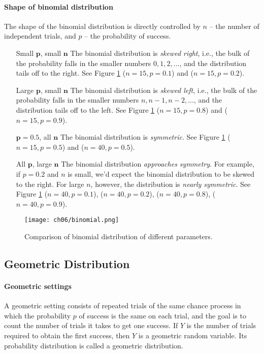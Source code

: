 \paragraph{Shape of binomial distribution} The shape of the binomial distribution is directly controlled by $n$ -- the number of independent trials, and $p$ -- the probability of success.
\begin{itemize}[font=\sffamily\bfseries, leftmargin=3cm, style=nextline, itemsep=0cm]
\item[Small $\mathbf{p}$, small $\mathbf{n}$] The binomial distribution is \textit{skewed right}, i.e., the bulk of the probability falls in the smaller numbers $0, 1, 2, ...$, and the distribution tails off to the right. See Figure \ref{fig:binomial} ($n=15, p=0.1$) and ($n=15, p=0.2$).
\item[Large $\mathbf{p}$, small $\mathbf{n}$] The binomial distribution is \textit{skewed left}, i.e., the bulk of the probability falls in the smaller numbers $n, n-1, n-2, ...$, and the distribution tails off to the left. See Figure \ref{fig:binomial} ($n=15, p=0.8$) and ($n=15, p=0.9$).
\item[$\mathbf{p=0.5}$, all $\mathbf{n}$] The binomial distribution is \textit{symmetric}. See Figure \ref{fig:binomial} ($n=15, p=0.5$) and ($n=40, p=0.5$).
\item[All $\mathbf{p}$, large $\mathbf{n}$] The binomial distribution \textit{approaches symmetry}. For example, if $p=0.2$ and $n$ is small, we'd expect the binomial distribution to be skewed to the right. For large $n$, however, the distribution is \textit{nearly symmetric}. See Figure \ref{fig:binomial} ($n=40, p=0.1$), ($n=40, p=0.2$), ($n=40, p=0.8$), ($n=40, p=0.9$).
\end{itemize}

\begin{figure}[ht!]
    \centering
    \texttt{[image: ch06/binomial.png]}
    \caption{Comparison of binomial distribution of different parameters.}
    \label{fig:binomial}
\end{figure}

\subsection{Geometric Distribution}

\paragraph{Geometric settings} A geometric setting consists of repeated trials of the same chance process in which the probability $p$ of success is the same on each trial, and the goal is to count the number of trials it takes to get one success. If $Y$ is the number of trials required to obtain the first success, then $Y$ is a geometric random variable. Its probability distribution is called a geometric distribution.

